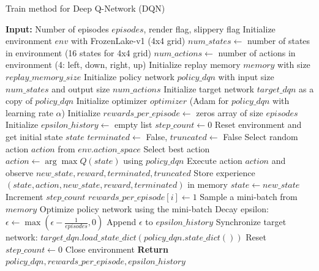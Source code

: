 \begin{algorithm}[H]
    \caption{Train method for Deep Q-Network (DQN)}
    \begin{algorithmic}[1]
    \State \textbf{Input:} Number of episodes $episodes$, render flag, slippery flag
    \State Initialize environment $env$ with FrozenLake-v1 (4x4 grid)
    \State $num\_states \gets$ number of states in environment (16 states for 4x4 grid)
    \State $num\_actions \gets$ number of actions in environment (4: left, down, right, up)
    \State Initialize replay memory $memory$ with size $replay\_memory\_size$
    \State Initialize policy network $policy\_dqn$ with input size $num\_states$ and output size $num\_actions$
    \State Initialize target network $target\_dqn$ as a copy of $policy\_dqn$
    \State Initialize optimizer $optimizer$ (Adam for $policy\_dqn$ with learning rate $\alpha$)
    \State Initialize $rewards\_per\_episode \gets$ zeros array of size $episodes$
    \State Initialize $epsilon\_history \gets$ empty list
    \State $step\_count \gets 0$
        \State Reset environment and get initial state $state$
        \State $terminated \gets$ False, $truncated \gets$ False
                \State Select random action $action$ from $env.action\_space$
            \Else
                \State Select best action $action \gets \arg\max Q(state)$ using $policy\_dqn$
            \EndIf
            \State Execute action $action$ and observe $new\_state, reward, terminated, truncated$
            \State Store experience $(state, action, new\_state, reward, terminated)$ in memory
            \State $state \gets new\_state$
            \State Increment $step\_count$
        \EndWhile
            \State $rewards\_per\_episode[i] \gets 1$
        \EndIf
            \State Sample a mini-batch from $memory$
            \State Optimize policy network using the mini-batch
        \EndIf
        \State Decay epsilon: $\epsilon \gets \max(\epsilon - \frac{1}{episodes}, 0)$
        \State Append $\epsilon$ to $epsilon\_history$
            \State Synchronize target network: $target\_dqn.load\_state\_dict(policy\_dqn.state\_dict())$
            \State Reset $step\_count \gets 0$
        \EndIf
    \EndFor
    \State Close environment
    \State \textbf{Return} $policy\_dqn, rewards\_per\_episode, epsilon\_history$
    \end{algorithmic}
    \end{algorithm}
